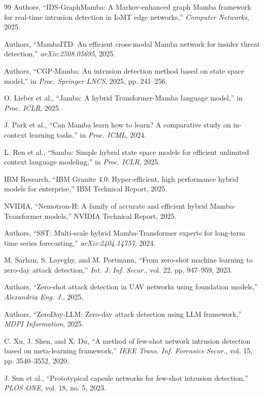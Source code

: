 \documentclass[journal]{IEEEtran}
\begin{document}
\begin{thebibliography}{99}
Authors, ``IDS-GraphMamba: A Markov-enhanced graph Mamba framework for real-time intrusion detection in IoMT edge networks,'' \emph{Computer Networks}, 2025.

Authors, ``MambaITD: An efficient cross-modal Mamba network for insider threat detection,'' \emph{arXiv:2508.05695}, 2025.

Authors, ``CGP-Mamba: An intrusion detection method based on state space model,'' in \emph{Proc. Springer LNCS}, 2025, pp. 241--256.

O. Lieber et al., ``Jamba: A hybrid Transformer-Mamba language model,'' in \emph{Proc. ICLR}, 2025.

J. Park et al., ``Can Mamba learn how to learn? A comparative study on in-context learning tasks,'' in \emph{Proc. ICML}, 2024.

L. Ren et al., ``Samba: Simple hybrid state space models for efficient unlimited context language modeling,'' in \emph{Proc. ICLR}, 2025.

IBM Research, ``IBM Granite 4.0: Hyper-efficient, high performance hybrid models for enterprise,'' IBM Technical Report, 2025.

NVIDIA, ``Nemotron-H: A family of accurate and efficient hybrid Mamba-Transformer models,'' NVIDIA Technical Report, 2025.

Authors, ``SST: Multi-scale hybrid Mamba-Transformer experts for long-term time series forecasting,'' \emph{arXiv:2404.14757}, 2024.

M. Sarhan, S. Layeghy, and M. Portmann, ``From zero-shot machine learning to zero-day attack detection,'' \emph{Int. J. Inf. Secur.}, vol. 22, pp. 947--959, 2023.

Authors, ``Zero-shot attack detection in UAV networks using foundation models,'' \emph{Alexandria Eng. J.}, 2025.

Authors, ``ZeroDay-LLM: Zero-day attack detection using LLM framework,'' \emph{MDPI Information}, 2025.

C. Xu, J. Shen, and X. Du, ``A method of few-shot network intrusion detection based on meta-learning framework,'' \emph{IEEE Trans. Inf. Forensics Secur.}, vol. 15, pp. 3540--3552, 2020.

J. Sun et al., ``Prototypical capsule networks for few-shot intrusion detection,'' \emph{PLOS ONE}, vol. 18, no. 5, 2023.


\end{thebibliography}
\end{document}
